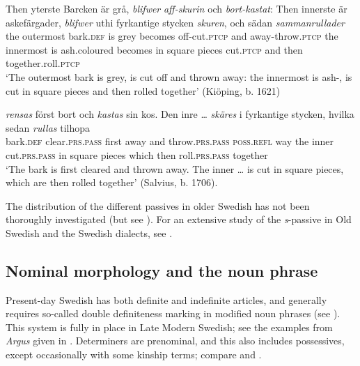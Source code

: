 \documentclass[output=paper]{langscibook}
\begin{document}
\ea\label{ex:intro:32}
\ea \label{ex:intro:32a}
\gll  Then   yterste     Barcken   är grå, \textit{blifwer}     \textit{aff-skurin} och \textit{bort-kastat}: Then innerste     är askefärgader, \textit{blifwer} uthi   fyrkantige   stycken \textit{skuren},   och   sädan \textit{sammanrullader}\\
the   outermost bark\textsc{.def}  is  grey becomes  off-cut\textsc{.ptcp}  and   away\textsc{{}-}throw.\textsc{ptcp} the     innermost   is ash.coloured   becomes  in    square     pieces cut\textsc{.ptcp} and   then     together.roll\textsc{.ptcp}\\
\glt  ‘The outermost bark is grey, is cut off and thrown away: the innermost is ash-, is cut in square pieces and then rolled together’ (Kiöping, b. 1621)

\ex \label{ex:intro:32b}
\gll  [barken] \textit{rensas} först bort och \textit{kastas} sin       kos. Den inre … \textit{skäres} i   fyrkantige   stycken,   hvilka sedan \textit{rullas} tilhopa\\
    bark.\textsc{def} clear.\textsc{prs.pass}   first away and throw.\textsc{prs.pass}   \textsc{poss.refl}   way the   inner {} cut.\textsc{prs.pass} in   square     pieces   which then     roll\textsc{.prs.pass} together\\

\glt `The bark is first cleared and thrown away. The inner … is cut in square pieces, which are then rolled together’ (Salvius, b. 1706).
\z
\z

The distribution of the different passives in older Swedish has not been thoroughly investigated (but see \citealt{Kirri1975}). For an extensive study of the \textit{s}{}-passive in Old Swedish and the Swedish dialects, see \citet{Holm1952}.


\subsection{Nominal morphology and the noun phrase}\label{sec:intro:3.4}


Present-day Swedish has both definite and indefinite articles, and generally requires so-called double definiteness marking in modified noun phrases (see \citealt{Julien2005}). This system is fully in place in Late Modern Swedish; see the examples from \textit{Argus} given in . Determiners are prenominal, and this also includes possessives, except occasionally with some kinship terms; compare  and .
\end{document}
